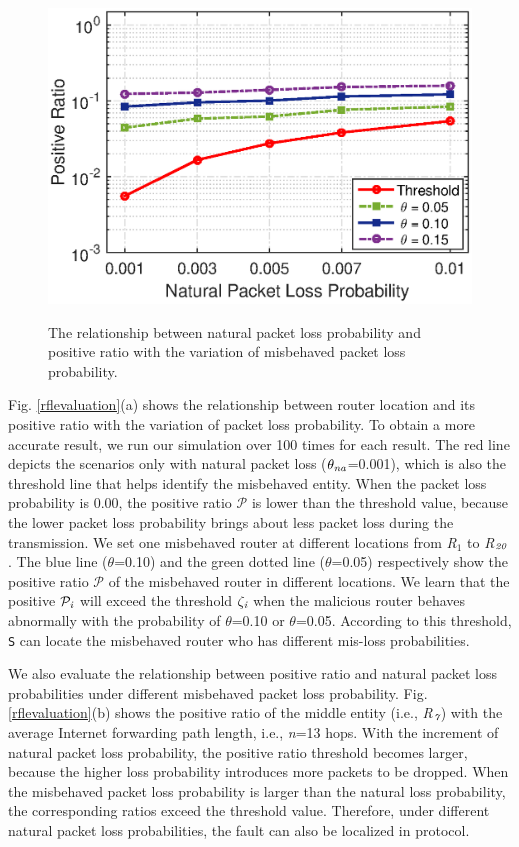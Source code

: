 \begin{figure}%
  \centering
  \includegraphics[width=0.85\columnwidth]{code_matlab/positiveratio22.eps}\\
  \caption{The relationship between natural packet loss probability and positive ratio with the variation of misbehaved packet loss probability.}\label{positiveratio2}
\end{figure}
\fi

Fig. \ref{rflevaluation}(a) shows the relationship between router location and its positive ratio with the variation of packet loss probability. To obtain a more accurate result, we run our simulation over 100 times for each result. The red line depicts the scenarios only with natural packet loss ($\theta_{\emph{na}}$=0.001), which is also the threshold line that helps identify the misbehaved entity. When the packet loss probability is 0.00, the positive ratio $\mathcal{P}$ is lower than the threshold value, because the lower packet loss probability brings about less packet loss during the transmission. We set one misbehaved router at different locations from \emph{R}$_1$ to \emph{R}$_{\emph{20}}$. The blue line ($\theta$=0.10) and the green dotted line ($\theta$=0.05) respectively show the positive ratio $\mathcal{P}$ of the misbehaved router in different locations. We learn that the positive $\mathcal{P_\emph{i}}$ will exceed the threshold $\zeta_\emph{i}$ when the malicious router behaves abnormally with the probability of $\theta$=0.10 or $\theta$=0.05. According to this threshold, {\tt S} can locate the misbehaved router who has different mis-loss probabilities.

We also evaluate the relationship between positive ratio and natural packet loss probabilities under different misbehaved packet loss probability. Fig. \ref{rflevaluation}(b) shows the positive ratio of the middle entity (i.e., \emph{R}$_\emph{7}$) with the average Internet forwarding path length, i.e., \emph{n}=13 hops. With the increment of natural packet loss probability, the positive ratio threshold becomes larger, because the higher loss probability introduces more packets to be dropped. When the misbehaved packet loss probability is larger than the natural loss probability, the corresponding ratios exceed the threshold value. Therefore, under different natural packet loss probabilities, the fault can also be localized in \name{} protocol.
\vspace{-0.1in}
